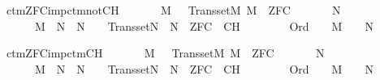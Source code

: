 \begin{isabelle}
\isamarkupfalse%
\ ctm{\isacharunderscore}{\kern0pt}ZFC{\isacharunderscore}{\kern0pt}imp{\isacharunderscore}{\kern0pt}ctm{\isacharunderscore}{\kern0pt}not{\isacharunderscore}{\kern0pt}CH{\isacharcolon}{\kern0pt}\isanewline
\ \ \isanewline
\ \ \ \ {\isachardoublequoteopen}M\ {\isasymapprox}\ {\isasymomega}{\isachardoublequoteclose}\ {\isachardoublequoteopen}Transset{\isacharparenleft}{\kern0pt}M{\isacharparenright}{\kern0pt}{\isachardoublequoteclose}\ {\isachardoublequoteopen}M\ {\isasymTurnstile}\ ZFC{\isachardoublequoteclose}\isanewline
\ \ \isanewline
\ \ \ \ {\isachardoublequoteopen}{\isasymexists}N{\isachardot}{\kern0pt}\isanewline
\ \ \ \ \ \ M\ {\isasymsubseteq}\ N\ {\isasymand}\ N\ {\isasymapprox}\ {\isasymomega}\ {\isasymand}\ Transset{\isacharparenleft}{\kern0pt}N{\isacharparenright}{\kern0pt}\ {\isasymand}\ N\ {\isasymTurnstile}\ ZFC\ {\isasymunion}\ {\isacharbraceleft}{\kern0pt}{\isasymcdot}{\isasymnot}{\isasymcdot}CH{\isasymcdot}{\isasymcdot}{\isacharbraceright}{\kern0pt}\ {\isasymand}\isanewline
\ \ \ \ \ \ {\isacharparenleft}{\kern0pt}{\isasymforall}{\isasymalpha}{\isachardot}{\kern0pt}\ Ord{\isacharparenleft}{\kern0pt}{\isasymalpha}{\isacharparenright}{\kern0pt}\ {\isasymlongrightarrow}\ {\isacharparenleft}{\kern0pt}{\isasymalpha}\ {\isasymin}\ M\ {\isasymlongleftrightarrow}\ {\isasymalpha}\ {\isasymin}\ N{\isacharparenright}{\kern0pt}{\isacharparenright}{\kern0pt}{\isachardoublequoteclose}
\end{isabelle}

\begin{isabelle}
\isamarkupfalse%
\ ctm{\isacharunderscore}{\kern0pt}ZFC{\isacharunderscore}{\kern0pt}imp{\isacharunderscore}{\kern0pt}ctm{\isacharunderscore}{\kern0pt}CH{\isacharcolon}{\kern0pt}\isanewline
\ \ \isanewline
\ \ \ \ {\isachardoublequoteopen}M\ {\isasymapprox}\ {\isasymomega}{\isachardoublequoteclose}\ {\isachardoublequoteopen}Transset{\isacharparenleft}{\kern0pt}M{\isacharparenright}{\kern0pt}{\isachardoublequoteclose}\ {\isachardoublequoteopen}M\ {\isasymTurnstile}\ ZFC{\isachardoublequoteclose}\isanewline
\ \ \isanewline
\ \ \ \ {\isachardoublequoteopen}{\isasymexists}N{\isachardot}{\kern0pt}\isanewline
\ \ \ \ \ \ M\ {\isasymsubseteq}\ N\ {\isasymand}\ N\ {\isasymapprox}\ {\isasymomega}\ {\isasymand}\ Transset{\isacharparenleft}{\kern0pt}N{\isacharparenright}{\kern0pt}\ {\isasymand}\ N\ {\isasymTurnstile}\ ZFC\ {\isasymunion}\ {\isacharbraceleft}{\kern0pt}{\isasymcdot}CH{\isasymcdot}{\isacharbraceright}{\kern0pt}\ {\isasymand}\isanewline
\ \ \ \ \ \ {\isacharparenleft}{\kern0pt}{\isasymforall}{\isasymalpha}{\isachardot}{\kern0pt}\ Ord{\isacharparenleft}{\kern0pt}{\isasymalpha}{\isacharparenright}{\kern0pt}\ {\isasymlongrightarrow}\ {\isacharparenleft}{\kern0pt}{\isasymalpha}\ {\isasymin}\ M\ {\isasymlongleftrightarrow}\ {\isasymalpha}\ {\isasymin}\ N{\isacharparenright}{\kern0pt}{\isacharparenright}{\kern0pt}{\isachardoublequoteclose}
\end{isabelle}

